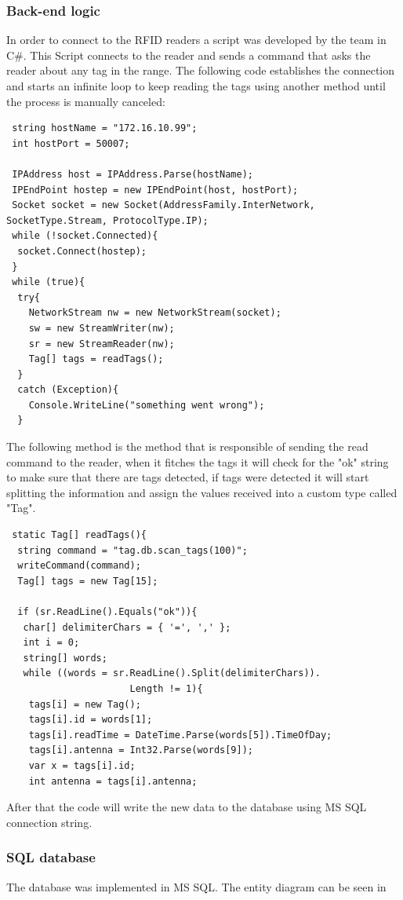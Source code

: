 \documentclass[a4paper,twoside]{IEEEtran}
\begin{document}
\subsubsection{Back-end logic}
In order to connect to the RFID readers a script was developed by the team in C\#. This Script connects to the reader and sends a command that asks the reader about any tag in the range. The following code establishes the connection and starts an infinite loop to keep reading the tags using another method until the process is manually canceled:
\lstset{style=sharpc}
\begin{lstlisting}
 string hostName = "172.16.10.99";
 int hostPort = 50007;

 IPAddress host = IPAddress.Parse(hostName);
 IPEndPoint hostep = new IPEndPoint(host, hostPort);
 Socket socket = new Socket(AddressFamily.InterNetwork, SocketType.Stream, ProtocolType.IP);
 while (!socket.Connected){
  socket.Connect(hostep);
 }
 while (true){
  try{
    NetworkStream nw = new NetworkStream(socket);
    sw = new StreamWriter(nw);
    sr = new StreamReader(nw);
    Tag[] tags = readTags();
  }
  catch (Exception){
    Console.WriteLine("something went wrong");
  }
\end{lstlisting}
The following method is the method that is responsible of sending the read command to the reader, when it fitches the tags it will check for the "ok" string to make sure that there are tags detected, if tags were detected it will start splitting the information and assign the values received into a custom type called "Tag".
\lstset{style=sharpc}
\begin{lstlisting}
 static Tag[] readTags(){ 
  string command = "tag.db.scan_tags(100)";
  writeCommand(command);
  Tag[] tags = new Tag[15];

  if (sr.ReadLine().Equals("ok")){
   char[] delimiterChars = { '=', ',' };
   int i = 0;
   string[] words;
   while ((words = sr.ReadLine().Split(delimiterChars)).
                      Length != 1){
    tags[i] = new Tag();
    tags[i].id = words[1];
    tags[i].readTime = DateTime.Parse(words[5]).TimeOfDay;
    tags[i].antenna = Int32.Parse(words[9]);
    var x = tags[i].id;
    int antenna = tags[i].antenna;
\end{lstlisting}
After that the code will write the new data to the database using MS SQL connection string.

\subsubsection{SQL database} The database was implemented in MS SQL. The entity diagram can be seen in \\
\end{document}
